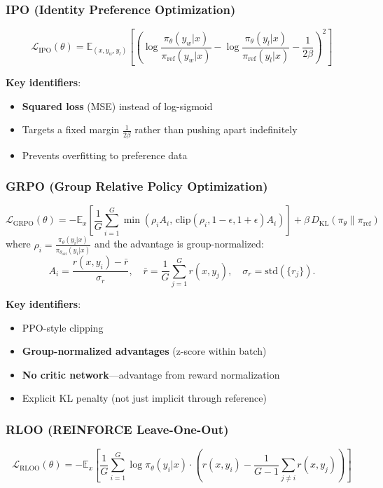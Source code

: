 \subsubsection{IPO (Identity Preference Optimization)}
\[
    \mathcal{L}_{\text{IPO}}(\theta) = \mathbb{E}_{(x, y_w, y_l)} \left[ \left( \log \frac{\pi_\theta(y_w|x)}{\pi_{\text{ref}}(y_w|x)} - \log \frac{\pi_\theta(y_l|x)}{\pi_{\text{ref}}(y_l|x)} - \frac{1}{2\beta} \right)^2 \right]
\]

\textbf{Key identifiers}:
\begin{itemize}
    \item \textbf{Squared loss} (MSE) instead of log-sigmoid
    \item Targets a fixed margin $\frac{1}{2\beta}$ rather than pushing apart indefinitely
    \item Prevents overfitting to preference data
\end{itemize}

\subsubsection{GRPO (Group Relative Policy Optimization)}
\[
    \mathcal{L}_{\text{GRPO}}(\theta) = -\mathbb{E}_{x} \left[ \frac{1}{G} \sum_{i=1}^{G} \min\left( \rho_i A_i, \, \text{clip}(\rho_i, 1-\epsilon, 1+\epsilon) A_i \right) \right] + \beta \, D_{\mathrm{KL}}(\pi_\theta \| \pi_{\text{ref}})
\]
where $\rho_i = \frac{\pi_\theta(y_i|x)}{\pi_{\theta_{\text{old}}}(y_i|x)}$ and the advantage is group-normalized:
\[
    A_i = \frac{r(x, y_i) - \bar{r}}{\sigma_r}, \quad \bar{r} = \frac{1}{G}\sum_{j=1}^{G} r(x, y_j), \quad \sigma_r = \text{std}(\{r_j\}).
\]

\textbf{Key identifiers}:
\begin{itemize}
    \item PPO-style clipping
    \item \textbf{Group-normalized advantages} (z-score within batch)
    \item \textbf{No critic network}---advantage from reward normalization
    \item Explicit KL penalty (not just implicit through reference)
\end{itemize}

\subsubsection{RLOO (REINFORCE Leave-One-Out)}
\[
    \mathcal{L}_{\text{RLOO}}(\theta) = -\mathbb{E}_x \left[ \frac{1}{G} \sum_{i=1}^{G} \log \pi_\theta(y_i|x) \cdot \left( r(x, y_i) - \frac{1}{G-1}\sum_{j \neq i} r(x, y_j) \right) \right]
\]

